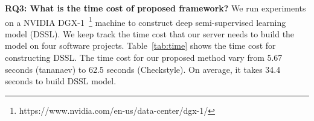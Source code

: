 \textbf{RQ3: What is the time cost of proposed framework?}
We run experiments on a NVIDIA DGX-1~\footnote{https://www.nvidia.com/en-us/data-center/dgx-1/} machine to construct deep semi-supervised learning model (DSSL). We keep track the time cost that our server needs to build the model on four software projects. Table~\ref{tab:time} shows the time cost for constructing DSSL. The time cost for our proposed method vary from 5.67 seconds (tananaev) to 62.5 seconds (Checkstyle). On average, it takes 34.4 seconds to build DSSL model.  



